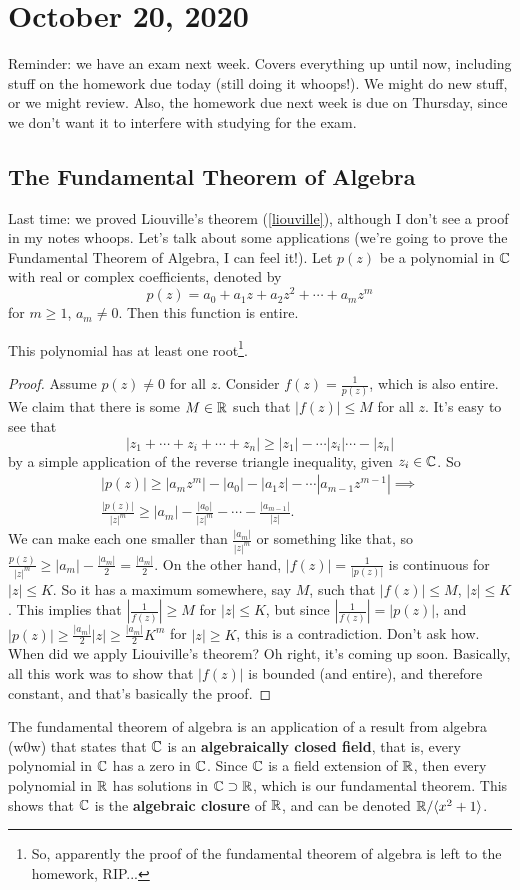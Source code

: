 \section{October 20, 2020}
Reminder: we have an exam next week. Covers everything up until now, including stuff on the homework due today (still doing it whoops!). We might do new stuff, or we might review. Also, the homework due next week is due on Thursday, since we don't want it to interfere with studying for the exam.
\subsection{The Fundamental Theorem of Algebra}
Last time: we proved Liouville's theorem (\cref{liouville}), although I don't see a proof in my notes whoops. Let's talk about some applications (we're going to prove the Fundamental Theorem of Algebra, I can feel it!).
\orbreak
    Let $p(z)$ be a polynomial in $\mathbb{C}$ with real or complex coefficients, denoted by \[
        p(z)=a_0+a_1z+a_2z^2+\cdots +a_mz^{m}
    \] for $m\geq 1$, $a_m\neq 0$. Then this function is entire. 
\begin{claim}
    This polynomial has at least one root\footnote{So, apparently the proof of the fundamental theorem of algebra is left to the homework, RIP...}.
\end{claim}
\begin{proof}
    Assume $p(z)\neq 0$ for all $z$. Consider $f(z)=\frac{1}{p(z)}$, which is also entire. We claim that there is some $M\in \mathbb{R}$ such that $|f(z)|\leq M$ for all $z$. It's easy to see that \[
    |z_1+\cdots +z_i +\cdots +z_n | \geq |z_1|-\cdots|z_i |\cdots  -|z_n |
    \]  by a simple application of the reverse triangle inequality, given $z_i \in \mathbb{C}$. So 
\begin{gather}
    |p(z)|\geq |a_mz^m|-|a_0|-|a_1z|-\cdots |a_{m-1}z^{m-1}| \implies \\
    \frac{|p(z)|}{|z|^m}\geq |a_m|- \frac{|a_0|}{|z|^m}- \cdots - \frac{|a_{m-1}|}{|z|}.
\end{gather}
We can make each one smaller than $\frac{|a_m|}{|z|^m}$ or something like that, so $\frac{p(z)}{|z|^m}\geq |a_m|-\frac{|a_m|}{2}=\frac{|a_m|}{2}$. On the other hand, $|f(z)|=\frac{1}{|p(z)|}$ is continuous for $|z|\leq K$. So it has a maximum somewhere, say $M$, such that $|f(z)|\leq M$, $|z|\leq K$. This implies that $\left| \frac{1}{f(z)} \right| \geq M$ for $|z|\leq K$, but since $\left| \frac{1}{f(z)} \right| =|p(z)|$, and $|p(z)|\geq \frac{|a_m|}{2}|z|\geq \frac{|a_m|}{2}K^m$ for $|z|\geq K$, this is a contradiction. Don't ask how. When did we apply Liouiville's theorem? Oh right, it's coming up soon. Basically, all this work was to show that $|f(z)|$ is bounded (and entire), and therefore constant, and that's basically the proof.
\end{proof} 
The fundamental theorem of algebra is an application of a result from algebra (w0w) that states that $\mathbb{C}$ is an \textbf{algebraically closed field}, that is, every polynomial in $\mathbb{C}$ has a zero in $\mathbb{C}$. Since $\mathbb{C}$ is a field extension of $\mathbb{R}$, then every polynomial in $\mathbb{R}$ has solutions in $\mathbb{C}\supset \mathbb{R}$, which is our fundamental theorem. This shows that $\mathbb{C}$ is the \textbf{algebraic closure} of $\mathbb{R}$, and can be denoted $\mathbb{R} / \langle x^2+1 \rangle $.

